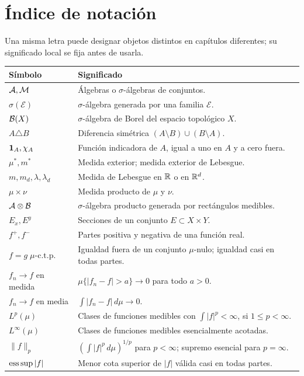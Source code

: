 \chapter*{Índice de notación}
Una misma letra puede designar objetos distintos en capítulos diferentes; su significado local se fija antes de usarla.
\begin{longtable}{@{}p{}p{}@{}}
\toprule Símbolo & Significado \\\midrule\endhead
$\mathcal A,\mathcal M$ & Álgebras o $\sigma$-álgebras de conjuntos.\\
$\sigma(\mathcal E)$ & $\sigma$-álgebra generada por una familia $\mathcal E$.\\
$\mathcal B(X)$ & $\sigma$-álgebra de Borel del espacio topológico $X$.\\
$A\triangle B$ & Diferencia simétrica $(A\setminus B)\cup(B\setminus A)$.\\
$\mathbf1_{A},\chi_A$ & Función indicadora de $A$, igual a uno en $A$ y a cero fuera.\\
$\mu^*,m^*$ & Medida exterior; medida exterior de Lebesgue.\\
$m,m_d,\lambda,\lambda_d$ & Medida de Lebesgue en $\mathbb R$ o en $\mathbb R^d$.\\
$\mu\times\nu$ & Medida producto de $\mu$ y $\nu$.\\
$\mathcal A\otimes\mathcal B$ & $\sigma$-álgebra producto generada por rectángulos medibles.\\
$E_x,E^y$ & Secciones de un conjunto $E\subset X\times Y$.\\
$f^+,f^-$ & Partes positiva y negativa de una función real.\\
$f=g\;\mu\text{-c.t.p.}$ & Igualdad fuera de un conjunto $\mu$-nulo; igualdad casi en todas partes.\\
$f_n\to f$ en medida & $\mu\{|f_n-f|>a\}\to0$ para todo $a>0$.\\
$f_n\to f$ en media & $\int|f_n-f|\,d\mu\to0$.\\
$L^p(\mu)$ & Clases de funciones medibles con $\int|f|^p<\infty$, si $1\le p<\infty$.\\
$L^\infty(\mu)$ & Clases de funciones medibles esencialmente acotadas.\\
$\|f\|_p$ & $(\int|f|^p\,d\mu)^{1/p}$ para $p<\infty$; supremo esencial para $p=\infty$.\\
$\operatorname*{ess\,sup} |f|$ & Menor cota superior de $|f|$ válida casi en todas partes.\\

\end{longtable}
